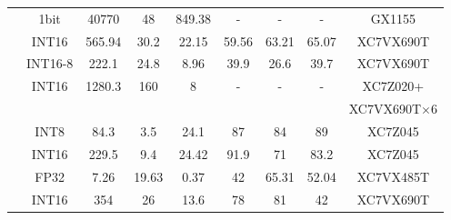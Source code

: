 \begin{table}[htbp]
\begin{tabular}{|r|c|c|c|c|c|c|c|c|}
            \cite{moss2017high} & 1bit  & 40770 & 48    & 849.38 &   -   &   -   &   -   & GX1155 \\
            \cite{li2016high} & INT16 & 565.94 & 30.2  & 22.15 & 59.56 & 63.21 & 65.07 & XC7VX690T \\
            \cite{liu2016automatic} & INT16-8 & 222.1 & 24.8  & 8.96  & 39.9  & 26.6  & 39.7  & XC7VX690T \\
        \multicolumn{1}{|c|}{\multirow{2}[0]{*}{\cite{zhang2016energy}}} & \multirow{2}[0]{*}{INT16} & \multirow{2}[0]{*}{1280.3} & \multirow{2}[0]{*}{160} & \multirow{2}[0]{*}{8} & \multirow{2}[0]{*}{-} & \multirow{2}[0]{*}{-} & \multirow{2}[0]{*}{-} & XC7Z020+ \\
        \multicolumn{1}{|c|}{} &       &       &       &       &       &       &       & XC7VX690T$\times$6 \\
            \cite{guo2017angel} & INT8  & 84.3  & 3.5   & 24.1  & 87    & 84    & 89    & XC7Z045 \\
            \cite{xiao2017exploring} & INT16 & 229.5 & 9.4   & 24.42 & 91.9  & 71    & 83.2  & XC7Z045 \\
            \cite{guan2017fpga} & FP32  & 7.26  & 19.63 & 0.37  & 42    & 65.31 & 52.04 & XC7VX485T \\
            \cite{zhang2016caffeine} & INT16 & 354   & 26    & 13.6  & 78    & 81    & 42    & XC7VX690T \\ \hline
        \end{tabular}%
    \label{tab:hardware_list}%
  \end{table}%